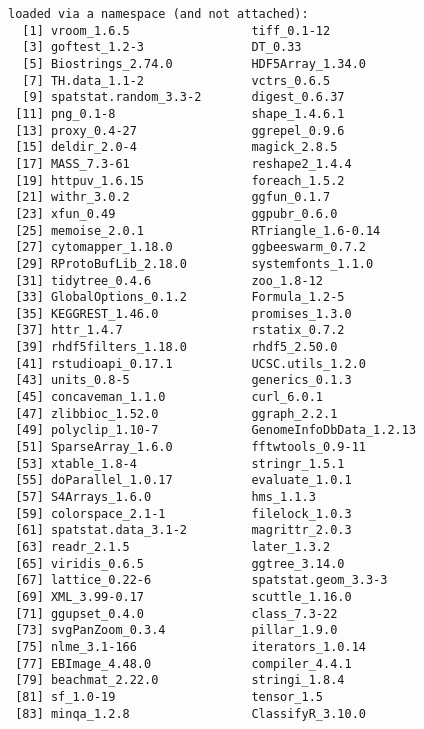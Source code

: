\documentclass[
  letterpaper,
  DIV=11,
  numbers=noendperiod]{scrreprt}
\begin{document}
\begin{verbatim}
loaded via a namespace (and not attached):
  [1] vroom_1.6.5                 tiff_0.1-12                
  [3] goftest_1.2-3               DT_0.33                    
  [5] Biostrings_2.74.0           HDF5Array_1.34.0           
  [7] TH.data_1.1-2               vctrs_0.6.5                
  [9] spatstat.random_3.3-2       digest_0.6.37              
 [11] png_0.1-8                   shape_1.4.6.1              
 [13] proxy_0.4-27                ggrepel_0.9.6              
 [15] deldir_2.0-4                magick_2.8.5               
 [17] MASS_7.3-61                 reshape2_1.4.4             
 [19] httpuv_1.6.15               foreach_1.5.2              
 [21] withr_3.0.2                 ggfun_0.1.7                
 [23] xfun_0.49                   ggpubr_0.6.0               
 [25] memoise_2.0.1               RTriangle_1.6-0.14         
 [27] cytomapper_1.18.0           ggbeeswarm_0.7.2           
 [29] RProtoBufLib_2.18.0         systemfonts_1.1.0          
 [31] tidytree_0.4.6              zoo_1.8-12                 
 [33] GlobalOptions_0.1.2         Formula_1.2-5              
 [35] KEGGREST_1.46.0             promises_1.3.0             
 [37] httr_1.4.7                  rstatix_0.7.2              
 [39] rhdf5filters_1.18.0         rhdf5_2.50.0               
 [41] rstudioapi_0.17.1           UCSC.utils_1.2.0           
 [43] units_0.8-5                 generics_0.1.3             
 [45] concaveman_1.1.0            curl_6.0.1                 
 [47] zlibbioc_1.52.0             ggraph_2.2.1               
 [49] polyclip_1.10-7             GenomeInfoDbData_1.2.13    
 [51] SparseArray_1.6.0           fftwtools_0.9-11           
 [53] xtable_1.8-4                stringr_1.5.1              
 [55] doParallel_1.0.17           evaluate_1.0.1             
 [57] S4Arrays_1.6.0              hms_1.1.3                  
 [59] colorspace_2.1-1            filelock_1.0.3             
 [61] spatstat.data_3.1-2         magrittr_2.0.3             
 [63] readr_2.1.5                 later_1.3.2                
 [65] viridis_0.6.5               ggtree_3.14.0              
 [67] lattice_0.22-6              spatstat.geom_3.3-3        
 [69] XML_3.99-0.17               scuttle_1.16.0             
 [71] ggupset_0.4.0               class_7.3-22               
 [73] svgPanZoom_0.3.4            pillar_1.9.0               
 [75] nlme_3.1-166                iterators_1.0.14           
 [77] EBImage_4.48.0              compiler_4.4.1             
 [79] beachmat_2.22.0             stringi_1.8.4              
 [81] sf_1.0-19                   tensor_1.5                 
 [83] minqa_1.2.8                 ClassifyR_3.10.0           

\end{verbatim}
\end{document}
